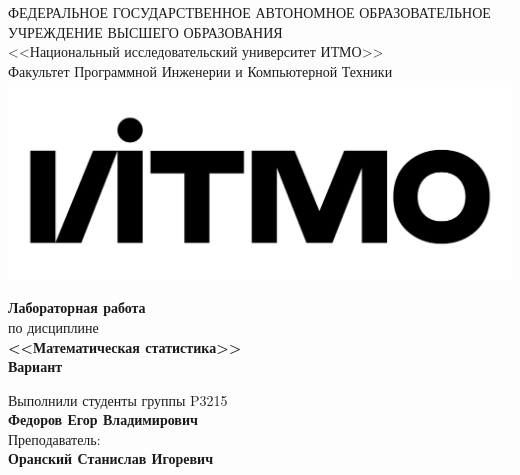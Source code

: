 \begin{titlepage}
	\thispagestyle{firststyle}
	\begin{center}
		ФЕДЕРАЛЬНОЕ ГОСУДАРСТВЕННОЕ АВТОНОМНОЕ ОБРАЗОВАТЕЛЬНОЕ УЧРЕЖДЕНИЕ ВЫСШЕГО ОБРАЗОВАНИЯ\\
		\vspace{0.5cm}
		<<Национальный исследовательский университет ИТМО>>\\
		Факультет Программной Инженерии и Компьютерной Техники \\
		\vspace{1cm}
		\includegraphics[scale=0.1]{img/itmo_logo.png}
	\end{center}

	\vspace{1cm}

	\begin{center}
		\large
		\textbf{Лабораторная работа }\\
		по дисциплине\\
		\textbf{<<Математическая статистика>>} \\
		\textbf{Вариант }
	\end{center}

	\vspace{2cm}

	\begin{flushright}
		Выполнили студенты  группы P3215\\
		\textbf{Федоров Егор Владимирович} \\
		Преподаватель: \\
		\textbf{Оранский Станислав Игоревич}\\
	\end{flushright}

\end{titlepage}
